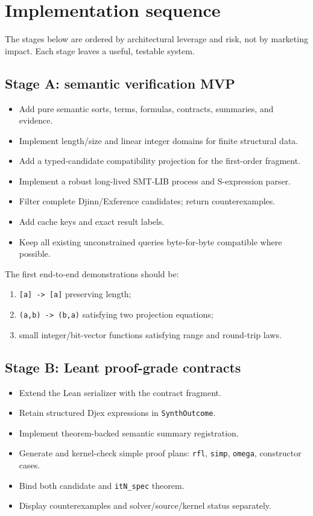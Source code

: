 \documentclass[11pt,oneside]{article}
\newcommand{\code}[1]{\texttt{#1}}
\begin{document}
\section{Implementation sequence}

The stages below are ordered by architectural leverage and risk, not by marketing
impact. Each stage leaves a useful, testable system.

\subsection{Stage A: semantic verification MVP}

\begin{itemize}
  \item Add pure semantic sorts, terms, formulas, contracts, summaries, and evidence.
  \item Implement length/size and linear integer domains for finite structural data.
  \item Add a typed-candidate compatibility projection for the first-order fragment.
  \item Implement a robust long-lived SMT-LIB process and S-expression parser.
  \item Filter complete Djinn/Exference candidates; return counterexamples.
  \item Add cache keys and exact result labels.
  \item Keep all existing unconstrained queries byte-for-byte compatible where possible.
\end{itemize}

The first end-to-end demonstrations should be:

\begin{enumerate}
  \item \code{[a] -> [a]} preserving length;
  \item \code{(a,b) -> (b,a)} satisfying two projection equations;
  \item small integer/bit-vector functions satisfying range and round-trip laws.
\end{enumerate}

\subsection{Stage B: Leant proof-grade contracts}

\begin{itemize}
  \item Extend the Lean serializer with the contract fragment.
  \item Retain structured Djex expressions in \code{SynthOutcome}.
  \item Implement theorem-backed semantic summary registration.
  \item Generate and kernel-check simple proof plans: \code{rfl}, \code{simp},
        \code{omega}, constructor cases.
  \item Bind both candidate and \code{itN\_spec} theorem.
  \item Display counterexamples and solver/source/kernel status separately.
\end{itemize}
\end{document}
